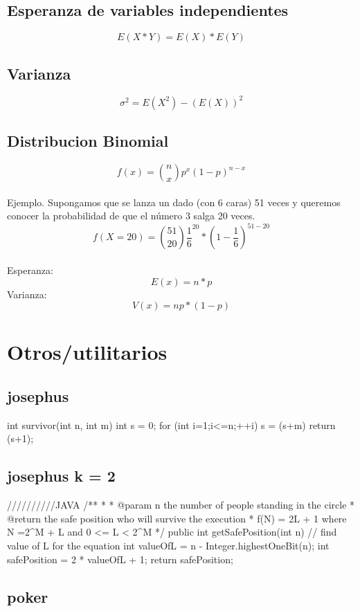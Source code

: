 \subsection{Esperanza de variables independientes}{
$$E(X*Y) = E(X) * E(Y)$$
}
\subsection{Varianza}{
$$\sigma ^ 2 = E(X ^ 2) - (E(X)) ^ 2 $$
}

\subsection{Distribucion Binomial}{
$$ f(x) = \binom {n}{x} p ^ x (1 - p) ^ {n - x} $$\\
Ejemplo. Supongamos que se lanza un dado (con 6 caras) 51 veces y queremos conocer la probabilidad de que el número 3 salga 20 veces.\\
$$ f(X = 20) = \binom {51}{20} \frac{1}{6} ^ {20} * (1 - \frac{1}{6}) ^ {51 - 20} $$\\
Esperanza:\\
$$ E(x) = n*p$$
Varianza:\\
$$ V(x) = np * (1 - p)$$
}

\section{Otros/utilitarios}
\subsection{josephus}
\begin{code}
int survivor(int n, int m){
   int s = 0;
   for (int i=1;i<=n;++i) s = (s+m)%
   return (s+1);
}
\end{code}
\subsection{josephus k = 2}
\begin{code}
//////////JAVA
    /**
	 * 
	 * @param n the number of people standing in the circle
	 * @return the safe position who will survive the execution 
	 *   f(N) = 2L + 1 where N =2^M + L and 0 <= L < 2^M
	 */
	public int getSafePosition(int n) {
		// find value of L for the equation
		int valueOfL = n - Integer.highestOneBit(n);
		int safePosition = 2 * valueOfL  + 1;	
		return safePosition;
	}
\end{code}
\subsection{poker}
